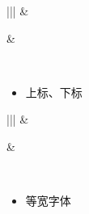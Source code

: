 \documentclass[a4paper,10pt,english]{sphinxmanual}
\begin{document}
\begin{savenotes}\sphinxattablestart
\centering
\begin{tabular}[t]{|||}
\hline
{}\relax &\relax \\
\hline\begin{sphinxfigure-in-table}
\centering

\noindent{}
\end{sphinxfigure-in-table}\relax
&\begin{sphinxfigure-in-table}
\centering

\noindent{}
\end{sphinxfigure-in-table}\relax
\\
\hline
\end{tabular}
\par
\sphinxattableend\end{savenotes}
\begin{itemize}
\item {} 
上标、下标

\end{itemize}


\begin{savenotes}\sphinxattablestart
\centering
\begin{tabular}[t]{|||}
\hline
{}\relax &\relax \\
\hline\begin{sphinxfigure-in-table}
\centering

\noindent{}
\end{sphinxfigure-in-table}\relax
&\begin{sphinxfigure-in-table}
\centering

\noindent{}
\end{sphinxfigure-in-table}\relax
\\
\hline
\end{tabular}
\par
\sphinxattableend\end{savenotes}
\begin{itemize}
\item {} 
等宽字体

\end{itemize}
\end{document}
